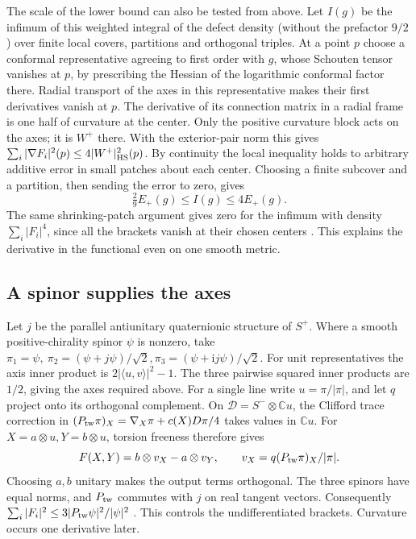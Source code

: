 \documentclass[11pt]{article}
\numberwithin{equation}{section}
\begin{document}
The scale of the lower bound can also be tested from above. Let
\(I(g)\) be the infimum of this weighted integral of the defect
density (without the prefactor \(9/2\)) over finite local covers,
partitions and orthogonal triples. At a point \(p\) choose a
conformal representative agreeing to first order with \(g\), whose
Schouten tensor vanishes at \(p\), by prescribing the Hessian of the
logarithmic conformal factor there. Radial transport of the axes in
this representative makes their first derivatives vanish at \(p\).
The derivative of its connection matrix in a radial frame is one half
of curvature at the center. Only the positive curvature block acts on
the axes; it is \(W^+\) there. With the exterior-pair norm this gives
\(\sum_i |\nabla F_i|^2(p)\le4|W^+|_{\rm HS}^2(p)\).
By continuity the local inequality holds to arbitrary additive error
in small patches about each center. Choosing a finite subcover and
a partition, then sending the error to zero, gives
\[
 \tfrac29 E_+(g)\le I(g)\le4E_+(g).
\]
The same shrinking-patch argument gives zero for the infimum with
density \(\sum_i|F_i|^4\), since all the brackets vanish at their
chosen centers \cite{Baker2026TwistorSections}. This explains the
derivative in the functional even on one smooth metric.

\subsection{A spinor supplies the axes}

Let \(j\) be the parallel antiunitary quaternionic structure of
\(S^+\). Where a smooth positive-chirality spinor \(\psi\) is nonzero,
take \(\pi_1=\psi,\ \pi_2=(\psi+j\psi)/\sqrt2,
\pi_3=(\psi+\mathrm i j\psi)/\sqrt2\). For unit representatives the
axis inner product is \(2|\langle u,v\rangle|^2-1\). The three
pairwise squared inner products are \(1/2\), giving the axes required
above. For a single line write \(u=\pi/|\pi|\), and let \(q\) project
onto its orthogonal complement. On
\(\mathcal D=S^-\otimes\mathbb C u\), the Clifford trace correction in
\((P_{\rm tw}\pi)_X=\nabla_X\pi+c(X)D\pi/4\) takes values in
\(\mathbb C u\). For \(X=a\otimes u,Y=b\otimes u\), torsion freeness
therefore gives
\[
 F(X,Y)= b\otimes v_X-a\otimes v_Y,\qquad
 v_X=q(P_{\rm tw}\pi)_X/|\pi|.
\]
Choosing \(a,b\) unitary makes the output terms orthogonal. The three
spinors have equal norms, and \(P_{\rm tw}\) commutes with \(j\) on
real tangent vectors. Consequently
\(\sum_i |F_i|^2\le 3|P_{\rm tw}\psi|^2/|\psi|^2\)
\cite{Baker2026TwistorSections}. This controls the undifferentiated
brackets. Curvature occurs one derivative later.
\end{document}
